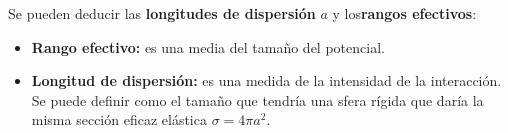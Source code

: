 Se pueden deducir las {\bf longitudes de dispersión} $a$ y  los{\bf rangos efectivos}: 

\begin{itemize}
    \item \textbf{Rango efectivo:} es una media del tamaño del potencial.
    \item \textbf{Longitud de dispersión:} es una medida de la intensidad de la interacción. Se puede definir como el tamaño que tendría una sfera rígida que daría la misma sección eficaz elástica $\sigma=4 \pi a^2$. 
\end{itemize}

